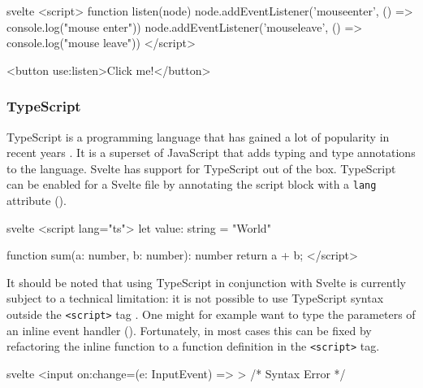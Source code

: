 \begin{listing}[H]
\begin{myminted}{svelte}{}
<script>
  function listen(node) {
    node.addEventListener('mouseenter', () => console.log("mouse enter"))
    node.addEventListener('mouseleave', () => console.log("mouse leave"))
  }
</script>

<button use:listen>Click me!</button>
\end{myminted}
\caption{Example usage of actions to register an event listener.}
\label{fig:svelte-use-directive}
\end{listing}


\subsubsection{TypeScript}
TypeScript is a programming language that has gained a lot of popularity in recent years \cite{noauthor_stack_nodate}. It is a superset of JavaScript that adds typing and type annotations to the language. Svelte has support for TypeScript out of the box. TypeScript can be enabled for a Svelte file by annotating the script block with a \texttt{lang} attribute (). 
\begin{listing}[H]
\begin{myminted}{svelte}{}
<script lang="ts">
  let value: string = "World"

  function sum(a: number, b: number): number {
    return a + b;
  }
</script>
\end{myminted}
\caption{Svelte file that uses TypeScript.}
\label{fig:svelte-ts-usage}
\end{listing}

It should be noted that using TypeScript in conjunction with Svelte is currently subject to a technical limitation: it is not possible to use TypeScript syntax outside the \texttt{<script>} tag \cite{noauthor_proposal_nodate}. One might for example want to type the parameters of an inline event handler (). Fortunately, in most cases this can be fixed by refactoring the inline function to a function definition in the \texttt{<script>} tag.
\begin{listing}[H]
\begin{myminted}{svelte}{}
<input on:change={(e: InputEvent) => {}}> /* Syntax Error */
\end{myminted}
\caption{TypeScript syntax in inline functions is currently not possible.}
\label{fig:svelte-ts-inline-error}
\end{listing}

